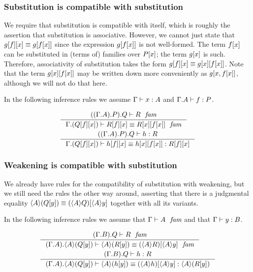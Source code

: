 \subsubsection{Substitution is compatible with substitution}\label{comp-ss}

We require that substitution is compatible with itself, which is roughly the
assertion that substitution is associative. However, we cannot just state that
$\subst{x}{{f}{g}}\jdeq\subst{{x}{f}}{g}$ since the expression $\subst{{x}{f}}{g}$
is not well-formed. The term $\subst{x}{f}$ can be substituted in (terms of) families over
$\subst{x}{P}$; the term $\subst{x}{g}$ is such. Therefore, associativity of
substitution takes the form $\subst{x}{{f}{g}}\jdeq\subst{{x}{f}}{{x}{g}}$.
Note that the term $\subst{{x}{f}}{{x}{g}}$ may be written down more conveniently
as $\subst{x,\subst{x}{f}}{g}$, although we will not do that here.

In the following inference rules we assume
$\jterm{\Gamma}{A}{x}$ and $\jterm{{\Gamma}{A}}{P}{f}$.

\begin{align}
&\inference{\jfam{{{{\Gamma}{A}}{P}}{Q}}{R}}
{\jfameq{{\Gamma}{\subst{x}{{f}{Q}}}}{\subst{x}{{f}{R}}}{\subst{{x}{f}}{{x}{R}}}}\label{comp-ss-f}\\
&\inference{\jterm{{{{\Gamma}{A}}{P}}{Q}}{R}{h}}
{\jtermeq{{\Gamma}{\subst{x}{{f}{Q}}}}{\subst{x}{{f}{R}}}{\subst{x}{{f}{h}}}{\subst{{x}{f}}{{x}{h}}}}\label{comp-ss-t}
\end{align}

\subsubsection{Weakening is compatible with substitution}\label{comp-ws}
We already have rules for the compatibility of substitution with weakening, but
we still need the rules the other way around, asserting that there is a 
judgmental equality $\ctxwk{A}{\subst{y}{Q}}\jdeq\subst{\ctxwk{A}{y}}{\ctxwk{A}{Q}}$
together with all its variants.

In the following inference rules we assume that $\jfam{\Gamma}{A}$ and that
$\jterm{\Gamma}{B}{y}$.

\begin{align}
& \inference{\jfam{{{\Gamma}{B}}{Q}}{R}}{\jfameq{{{\Gamma}{A}}{\ctxwk{A}{\subst{y}{Q}}}}{\ctxwk{A}{\subst{y}{R}}}{\subst{\ctxwk{A}{y}}{\ctxwk{A}{R}}}}\label{comp-ws-f}\\
& \inference{\jterm{{{\Gamma}{B}}{Q}}{R}{h}}{\jtermeq{{{\Gamma}{A}}{\ctxwk{A}{\subst{y}{Q}}}}{\ctxwk{A}{\subst{y}{R}}}{\ctxwk{A}{\subst{y}{h}}}{\subst{\ctxwk{A}{y}}{\ctxwk{A}{h}}}}\label{comp-ws-t}
\end{align}


